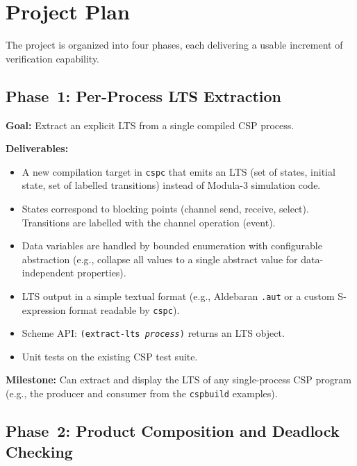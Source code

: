 \documentclass[11pt]{article}
\begin{document}
\section{Project Plan}

The project is organized into four phases, each delivering a usable
increment of verification capability.

\subsection{Phase~1: Per-Process LTS Extraction}

\textbf{Goal:} Extract an explicit LTS from a single compiled CSP
process.

\textbf{Deliverables:}
\begin{itemize}
\item A new compilation target in \texttt{cspc} that emits an LTS
  (set of states, initial state, set of labelled transitions) instead
  of Modula-3 simulation code.
\item States correspond to blocking points (channel send, receive,
  select).  Transitions are labelled with the channel operation
  (event).
\item Data variables are handled by bounded enumeration with
  configurable abstraction (e.g., collapse all values to a single
  abstract value for data-independent properties).
\item LTS output in a simple textual format (e.g., Aldebaran
  \texttt{.aut} or a custom S-expression format readable by
  \texttt{cspc}).
\item Scheme API: \texttt{(extract-lts \textit{process})} returns
  an LTS object.
\item Unit tests on the existing CSP test suite.
\end{itemize}

\textbf{Milestone:} Can extract and display the LTS of any single-process
CSP program (e.g., the producer and consumer from the \texttt{cspbuild}
examples).

\subsection{Phase~2: Product Composition and Deadlock Checking}
\end{document}
